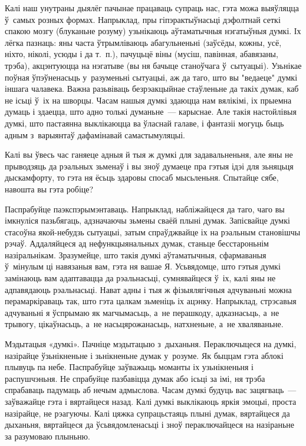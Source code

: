 Калі наш унутраны дыялёг пачынае працаваць супраць нас, гэта можа выяўляцца ў~самых розных формах. Напрыклад, пры гіпэрактыўнасьці дэфолтнай сеткі спакою мозгу (блуканьне розуму) узьнікаюць аўтаматычныя нэгатыўныя думкі. Іх лёгка пазнаць: яны часта ўтрымліваюць абагульненьні (заўсёды, кожны, усё, ніхто, ніколі, усюды і да т.~п.), пачуцьцё віны (мусіш, павінная, абавязаны, трэба), акцэнтуюцца на нэгатыве (вы ня бачыце станоўчага ў~сытуацыі). Узьнікае поўная ўпэўненасьць у~разуменьні сытуацыі, аж да таго, што вы "ведаеце" думкі іншага чалавека. Важна разьвіваць безрэакцыйнае стаўленьне да такіх думак, каб не ісьці ў~іх на шворцы. Часам нашыя думкі здаюцца нам вялікімі, іх прыемна думаць і здаецца, што адно толькі думаньне~--- карыснае. Але такія настойлівыя думкі, што пастаянна выклікаюцца ва ўласнай галаве, і фантазіі могуць быць адным з~варыянтаў дафамінавай самастымуляцыі. 

Калі вы ўвесь час ганяеце адныя й тыя ж думкі для задавальненьня, але яны не прыводзяць да рэальных зьменаў і вы зноў думаеце пра гэтыя ідэі для зьняцьця дыскамфорту, то гэта ня ёсьць здаровы спосаб мысьленьня. Спытайце сябе, навошта вы гэта робіце?

Паспрабуйце паэкспэрымэнтаваць. Напрыклад, набліжайцеся да таго, чаго вы імкнуліся пазьбягаць, адзначаючы зьмены сваёй плыні думак. Запісвайце думкі стасоўна якой-небудзь сытуацыі, затым спраўджвайце іх на рэальным становішчы рэчаў. Аддаляйцеся ад нефункцыянальных думак, станьце бесстароньнім назіральнікам. Зразумейце, што такія думкі аўтаматычныя, сфармаваныя ў~мінулым ці навязаныя вам, гэта ня вашае Я. Усьвядомце, што гэтыя думкі замінаюць вам адаптавацца да рэальнасьці, сумнявайцеся ў~іх, калі яны не адпавядаюць рэальнасьці. Нават адны і тыя ж фізыялягічныя адчуваньні можна перамаркіраваць так, што гэта цалкам зьменіць іх ацэнку. Напрыклад, стрэсавыя адчуваньні я ўспрымаю як магчымасьць, а~не перашкоду, адказнасьць, а~не трывогу, цікаўнасьць, а~не насьцярожанасьць, натхненьне, а~не хваляваньне.

Мэдытацыя «думкі». Пачніце мэдытацыю з~дыханьня. Пераключыцеся на думкі, назірайце ўзьнікненьне і зьнікненьне думак у~розуме. Як быццам гэта аблокі плывуць па небе. Паспрабуйце заўважыць моманты іх узьнікненьня і распушчэньня. Не спрабуйце пазбавіцца думак або ісьці за імі, ня трэба спрабаваць падумаць аб нечым адмыслова. Часам думкі будуць вас зацягваць~--- заўважайце гэта і вяртайцеся назад. Калі думкі выклікаюць яркія эмоцыі, проста назірайце, не рэагуючы. Калі цяжка супрацьстаяць плыні думак, вяртайцеся да дыханьня, вяртайцеся да ўсьвядомленасьці і зноў пераключайцеся на назіраньне за разумоваю плыньню.

